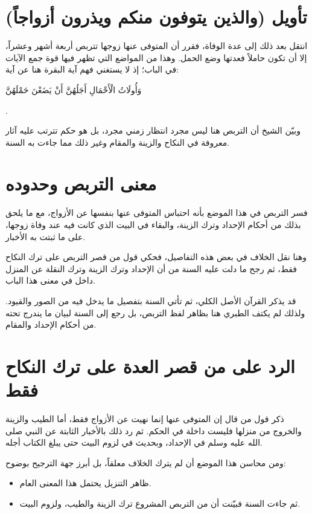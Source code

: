 \separator

\section{تأويل (والذين يتوفون منكم ويذرون أزواجاً)}
انتقل  بعد ذلك إلى عدة الوفاة، فقرر أن المتوفى عنها زوجها تتربص أربعة أشهر وعشراً، إلا أن تكون حاملاً فعدتها وضع الحمل. وهذا من المواضع التي تظهر فيها قوة جمع الآيات في الباب؛ إذ لا يستغني فهم آية البقرة هنا عن آية: \begin{ayah}وَأُولَاتُ الْأَحْمَالِ أَجَلُهُنَّ أَنْ يَضَعْنَ حَمْلَهُنَّ\end{ayah}.

وبيّن الشيخ أن التربص هنا ليس مجرد انتظار زمني مجرد، بل هو حكم تترتب عليه آثار معروفة في النكاح والزينة والمقام وغير ذلك مما جاءت به السنة.

\section{معنى التربص وحدوده}
فسر  التربص في هذا الموضع بأنه احتباس المتوفى عنها بنفسها عن الأزواج، مع ما يلحق بذلك من أحكام الإحداد وترك الزينة، والبقاء في البيت الذي كانت فيه عند وفاة زوجها، على ما ثبتت به الأخبار.

وهنا نقل الخلاف في بعض هذه التفاصيل، فحكي قول من قصر التربص على ترك النكاح فقط، ثم رجح ما دلت عليه السنة من أن الإحداد وترك الزينة وترك النقلة عن المنزل داخل في معنى هذا الباب.

\begin{fawaid}
قد يذكر القرآن الأصل الكلي، ثم تأتي السنة بتفصيل ما يدخل فيه من الصور والقيود. ولذلك لم يكتف الطبري هنا بظاهر لفظ التربص، بل رجع إلى السنة لبيان ما يندرج تحته من أحكام الإحداد والمقام.
\end{fawaid}

\section{الرد على من قصر العدة على ترك النكاح فقط}
ذكر  قول من قال إن المتوفى عنها إنما نهيت عن الأزواج فقط، أما الطيب والزينة والخروج من منزلها فليست داخلة في الحكم. ثم رد ذلك بالأخبار الثابتة عن النبي صلى الله عليه وسلم في الإحداد، وبحديث  في لزوم البيت حتى يبلغ الكتاب أجله.

ومن محاسن هذا الموضع أن  لم يترك الخلاف معلقاً، بل أبرز جهة الترجيح بوضوح:
\begin{itemize}
    \item ظاهر التنزيل يحتمل هذا المعنى العام.
    \item ثم جاءت السنة فبيّنت أن من التربص المشروع ترك الزينة والطيب، ولزوم البيت.
\end{itemize}

